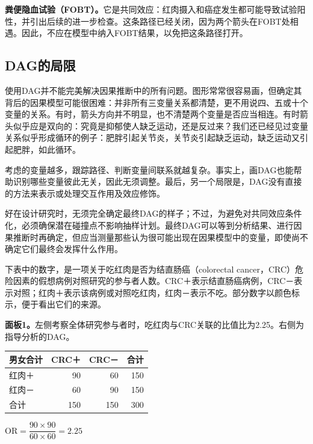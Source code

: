 \textbf{粪便隐血试验（FOBT）。}它是共同效应：红肉摄入和癌症发生都可能导致试验阳性，并引出后续的进一步检查。这条路径已经关闭，因为两个箭头在FOBT处相遇。因此，不应在模型中纳入FOBT结果，以免把这条路径打开。

\subsection{DAG的局限}
使用DAG并不能完美解决因果推断中的所有问题。图形常常很容易画，但确定其背后的因果模型可能很困难：并非所有三变量关系都清楚，更不用说四、五或十个变量的关系。有时，箭头方向并不明显，也不清楚两个变量是否应当相连。有时箭头似乎应是双向的：究竟是抑郁使人缺乏运动，还是反过来？我们还已经见过变量关系似乎形成循环的例子：肥胖引起关节炎，关节炎引起缺乏运动，缺乏运动又引起肥胖，如此循环。

考虑的变量越多，跟踪路径、判断变量间联系就越复杂。事实上，画DAG也能帮助识别哪些变量彼此无关，因此无须调整。最后，另一个局限是，DAG没有直接的方法来表示或处理交互作用及效应修饰。

好在设计研究时，无须完全确定最终DAG的样子；不过，为避免对共同效应条件化，必须确保潜在碰撞点不影响抽样计划。最终DAG可以等到分析结果、进行因果推断时再确定，但应当测量那些认为很可能出现在因果模型中的变量，即使尚不确定它们最终会发挥什么作用。

下表中的数字，是一项关于吃红肉是否为结直肠癌（colorectal cancer，CRC）危险因素的假想病例对照研究的参与者人数。CRC＋表示结直肠癌病例，CRC－表示对照；红肉＋表示该病例或对照吃红肉，红肉－表示不吃。部分数字以颜色标示，便于看出它们的来源。

\textbf{面板1。}左侧考察全体研究参与者时，吃红肉与CRC关联的比值比为2.25。右侧为指导分析的DAG。
\begin{center}
\begin{minipage}{.54\textwidth}\centering
\begin{tabular}{lrrr}\toprule 男女合计&CRC＋&CRC－&合计\\\midrule
红肉＋&90&60&\textcolor{chTenRed}{150}\\红肉－&60&90&\textcolor{chTenPurple}{150}\\合计&\textcolor{chTenCyan}{150}&\textcolor{chTenTeal}{150}&300\\\bottomrule
\end{tabular}\par\medskip $\mathrm{OR}=\dfrac{90\times90}{60\times60}=2.25$
\end{minipage}\hfill
\begin{minipage}{.4\textwidth}\centering\chTenSexDAG\end{minipage}
\end{center}

